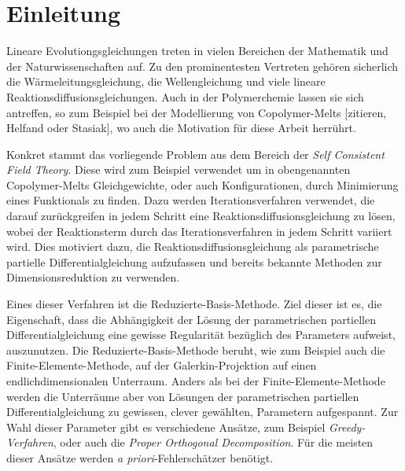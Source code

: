
\chapter*{Einleitung} %
\label{cha:einleitung}

Lineare Evolutiongsgleichungen treten in vielen Bereichen der Mathematik und der Naturwissenschaften auf.
Zu den prominentesten Vertreten gehören sicherlich die Wärmeleitungsgleichung, die Wellengleichung und viele lineare Reaktionsdiffusionsgleichungen.
Auch in der Polymerchemie lassen sie sich antreffen, so zum Beispiel bei der Modellierung von Copolymer-Melts [zitieren, Helfand oder Stasiak], wo auch die Motivation für diese Arbeit herrührt.

Konkret stammt das vorliegende Problem aus dem Bereich der \emph{Self Consistent Field Theory}.
Diese wird zum Beispiel verwendet um in obengenannten Copolymer-Melts Gleichgewichte, oder auch Konfigurationen, durch Minimierung eines Funktionals zu finden.
Dazu werden Iterationsverfahren verwendet, die darauf zurückgreifen in jedem Schritt eine Reaktionsdiffusionsgleichung zu lösen, wobei der Reaktionsterm durch das Iterationsverfahren in jedem Schritt variiert wird.
Dies motiviert dazu, die Reaktionsdiffusionsgleichung als parametrische partielle Differentialgleichung aufzufassen und bereits bekannte Methoden zur Dimensionsreduktion zu verwenden.

Eines dieser Verfahren ist die Reduzierte-Basis-Methode.
Ziel dieser ist es, die Eigenschaft, dass die Abhängigkeit der Lösung der parametrischen partiellen Differentialgleichung eine gewisse Regularität bezüglich des Parameters aufweist, auszunutzen.
Die Reduzierte-Basis-Methode beruht, wie zum Beispiel auch die Finite-Elemente-Methode, auf der Galerkin-Projektion auf einen endlichdimensionalen Unterraum.
Anders als bei der Finite-Elemente-Methode werden die Unterräume aber von Lösungen der parametrischen partiellen Differentialgleichung zu gewissen, clever gewählten, Parametern aufgespannt.
Zur Wahl dieser Parameter gibt es verschiedene Ansätze, zum Beispiel \emph{Greedy-Verfahren}, oder auch die \emph{Proper Orthogonal Decomposition}.
Für die meisten dieser Ansätze werden \emph{a priori}-Fehlerschätzer benötigt.


